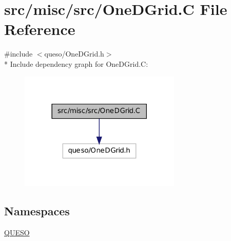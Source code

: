 \hypertarget{_one_d_grid_8_c}{\section{src/misc/src/\-One\-D\-Grid.C File Reference}
\label{_one_d_grid_8_c}
}
{\ttfamily \#include $<$queso/\-One\-D\-Grid.\-h$>$}\\*
Include dependency graph for One\-D\-Grid.\-C\-:
\nopagebreak
\begin{figure}[H]
\begin{center}
\leavevmode
\includegraphics[width=218pt]{_one_d_grid_8_c__incl}
\end{center}
\end{figure}
\subsection*{Namespaces}
\begin{DoxyCompactItemize}
\item 
\hyperlink{namespace_q_u_e_s_o}{Q\-U\-E\-S\-O}
\end{DoxyCompactItemize}
